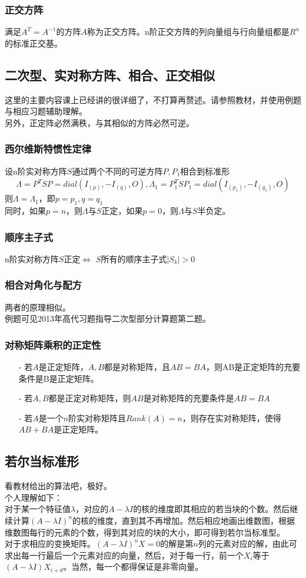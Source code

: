 \documentclass[UTF8]{ctexart}
\begin{document}
	\subsubsection{正交方阵}
	满足$A^{T}=A^{-1}$的方阵$A$称为正交方阵。n阶正交方阵的列向量组与行向量组都是$R^{n}$的标准正交基。
	\subsection{二次型、实对称方阵、相合、正交相似}
	这里的主要内容课上已经讲的很详细了，不打算再赘述。请参照教材，并使用例题与相应习题辅助理解。\\
	\indent
	另外，正定阵必然满秩，与其相似的方阵必然可逆。
	\subsubsection{西尔维斯特惯性定律}
	设n阶实对称方阵$S$通过两个不同的可逆方阵$P,P_{1}$相合到标准形
	\[\Lambda=P^{T}SP=dial(I_{(p)},-I_{(q)},\mathit{O}),\Lambda_{1}=P_{1}^{T}SP_{1}=dial(I_{(p_1)},-I_{(q_1)},\mathit{O}) \]
	则$\Lambda=\Lambda_{1}$，即$p=p_1,q=q_1$\\
	\indent
	同时，如果$p=n$，则$\Lambda$与$S$正定，如果$p=0$，则$\Lambda$与$S$半负定。
	\subsubsection{顺序主子式}
	n阶实对称方阵$S$正定$\Leftrightarrow$ $S$所有的顺序主子式$|S_k|>0$
	\subsubsection{相合对角化与配方}
	两者的原理相似。\\
	\indent
	例题可见2013年高代习题指导二次型部分计算题第二题。
	\subsubsection{对称矩阵乘积的正定性}
	\begin{itemize}
		\item [-]若$A$是正定矩阵，$A,B$都是对称矩阵，且$AB=BA$，则AB是正定矩阵的充要条件是B是正定矩阵。
		\item [-]若$A,B$都是正定对称矩阵，则$AB$是对称矩阵的充要条件是$AB=BA$
		\item [-]若$A$是一个$n$阶实对称矩阵且$Rank(A)=n$，则存在实对称矩阵，使得$AB+BA$是正定矩阵。
	\end{itemize}
	\subsection{若尔当标准形}
	看教材给出的算法吧，极好。\\
	\indent
	个人理解如下：\\
	\indent
	对于某一个特征值$\lambda$，对应的$A-\lambda I$的核的维度即其相应的若当块的个数。然后继续计算$(A-\lambda I)^{n}$的核的维度，直到其不再增加。然后相应地画出维数图，根据维数图每行的元素的个数，得到其对应的块的大小，即可得到若尔当标准型。\\
	\indent
	对于求相应的变换矩阵。$(A-\lambda I)^{n}\mathit{X}=\mathit{0}$的解是第$n$列的元素对应的解，由此可求出每一行最后一个元素对应的向量，然后，对于每一行，前一个$\mathit{X_{i}}$等于$(A-\lambda I)\mathit{X_{i+d}}$。当然，每一个都得保证是非零向量。
\end{document}
